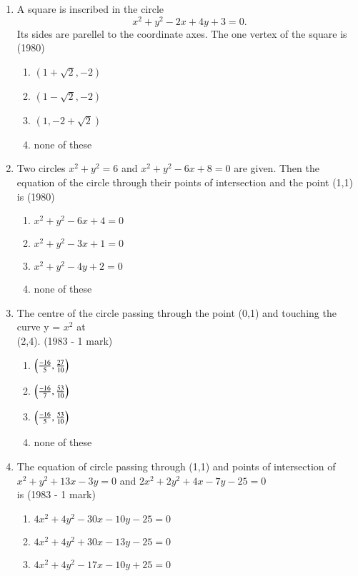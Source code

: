 \documentclass[journal,12pt,twocolumn]{IEEEtran}
\theoremstyle{remark}
\begin{document}
\begin{enumerate}[label=\arabic*.]
    \item A square is inscribed in the circle \[\ x^{2} + y^{2} - 2x +4y +3= 0.\] Its sides are parellel to the coordinate axes. The one vertex of the square is \hfill {(1980)}
    \begin{enumerate}[label=(\alph*)]
    \item $(1+\sqrt{2}, -2)$ 
    \item $(1-\sqrt{2}, -2)$
    \item $(1, -2 +\sqrt{2})$
    \item none of these
    \end{enumerate}
    \item Two circles $x^{2} + y^{2} = 6$ and $x^{2} + y^{2}-6x +8=0$ are given. Then the equation of the circle through their points of intersection and the point (1,1) is \hfill {(1980)}
    \begin{enumerate}[label=(\alph*)]
    \item $x^{2}+y^{2}-6x+4=0$ 
    \item $x^{2}+y^{2}-3x+1=0$
    \item $x^{2}+y^{2}-4y+2=0$
    \item none of these
    \end{enumerate}
    \item The centre of the circle passing through the point (0,1) and touching the curve y = $x^{2}$ at \\ (2,4).
    \hfill {(1983 - 1 mark)}
    \begin{enumerate}[label=(\alph*)]
    \item $\left(\frac{-16}{5},\frac{27}{10}\right)$
    \item $\left(\frac{-16}{7},\frac{53}{10}\right)$
    \item $\left(\frac{-16}{5},\frac{53}{10}\right)$
    \item none of these
    \end{enumerate}
    \item The equation of circle passing through (1,1) and points of intersection of $x^{2}+y^{2}+13x-3y=0$ and $2x^{2}+2y^{2}+4x-7y-25=0$\\ is
    \hfill {(1983 - 1 mark)}
    \begin{enumerate}[label=(\alph*)]
    \item $4x^{2}+4y^{2}-30x-10y-25=0$
    \item $4x^{2}+4y^{2}+30x-13y-25=0$
    \item $4x^{2}+4y^{2}-17x-10y+25=0$

\end{enumerate}
\end{enumerate}
\end{document}
